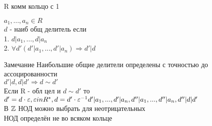 
R комм кольцо с 1 
\begin{definition}
	$ a_1, ..., a_n \in R $\\
	$d $ - наиб общ делитель если \\
	1. $ d | a_1, ..., d | a_n $ \\
	2. $ \forall d' (d' | a_1, ..., d' | a_n) \Rightarrow d' | d $ \\
\end{definition}
Замечание Наибольшие общие делители определены с точностью до ассоцированности \\
$ d' | d, d | d' \Rightarrow d \sim d' $ \\
Если R - обл цел и $ d \sim d' $ то $ d' = d \cdot \varepsilon, \varepsilon in R^*, d = d' \cdot \varepsilon^{-1} d' | a_1, ..., d' | a_n, d'' | a_1, ..., d'' | a_n, d'' | d | d' $ \\
В $ \mathbb{Z} $ НОД можно выбрать для неотрицательных \\
НОД определён не во всяком кольце

